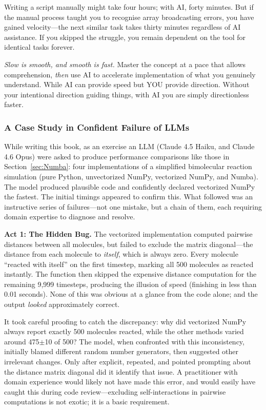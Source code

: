 Writing a script manually might take four hours; with AI, forty minutes. But if the manual process taught you to recognise array broadcasting errors, you have gained velocity---the next similar task takes thirty minutes regardless of AI assistance. If you skipped the struggle, you remain dependent on the tool for identical tasks forever.

\textit{Slow is smooth, and smooth is fast.} Master the concept at a pace that allows comprehension, \textit{then} use AI to accelerate implementation of what you genuinely understand. While AI can provide speed but YOU provide direction. Without your intentional direction guiding things, with AI you are simply directionless faster.

\subsubsection*{A Case Study in Confident Failure of LLMs}

While writing this book, as an exercise an LLM (Claude 4.5 Haiku, and Claude 4.6 Opus) were asked to produce performance comparisons like those in Section~\ref{sec:Numba}: four implementations of a simplified bimolecular reaction simulation (pure Python, unvectorized NumPy, vectorized NumPy, and Numba). The model produced plausible code and confidently declared vectorized NumPy the fastest. The initial timings appeared to confirm this. What followed was an instructive series of failures---not one mistake, but a chain of them, each requiring domain expertise to diagnose and resolve.

\medskip
\noindent\textbf{Act 1: The Hidden Bug.} The vectorized implementation computed pairwise distances between all molecules, but failed to exclude the matrix diagonal---the distance from each molecule to \emph{itself}, which is always zero. Every molecule ``reacted with itself'' on the first timestep, marking all 500 molecules as reacted instantly. The function then skipped the expensive distance computation for the remaining 9,999 timesteps, producing the illusion of speed (finishing in less than 0.01 seconds). None of this was obvious at a glance from the code alone; and the output \emph{looked} approximately correct.

It took careful proofing to catch the discrepancy: why did vectorized NumPy always report exactly 500 molecules reacted, while the other methods varied around 475$\pm$10 of 500? The model, when confronted with this inconsistency, initially blamed different random number generators, then suggested other irrelevant changes. Only after explicit, repeated, and pointed prompting about the distance matrix diagonal did it identify that issue. A practitioner with domain experience would likely not have made this error, and would easily have caught this during code review---excluding self-interactions in pairwise computations is not exotic; it is a basic requirement.

